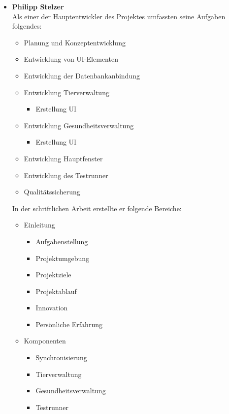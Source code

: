 \begin{itemize}

\item \textbf{Philipp Stelzer}\\
Als einer der Hauptentwickler des Projektes umfassten seine Aufgaben folgendes:
\begin{itemize}
\item Planung und Konzeptentwicklung
\item Entwicklung von UI-Elementen
\item Entwicklung der Datenbankanbindung
\item Entwicklung Tierverwaltung
\begin{itemize}
\item Erstellung UI
\end{itemize}
\item Entwicklung Gesundheitsverwaltung
\begin{itemize}
\item Erstellung UI
\end{itemize}
\item Entwicklung Hauptfenster
\item Entwicklung des Testrunner
\item Qualitätssicherung
\end{itemize}

In der schriftlichen Arbeit erstellte er folgende Bereiche:
\begin{itemize}
\item Einleitung
\begin{itemize}
\item Aufgabenstellung
\item Projektumgebung
\item Projektziele
\item Projektablauf
\item Innovation
\item Persönliche Erfahrung
\end{itemize}
\item Komponenten
\begin{itemize}
\item Synchronisierung
\item Tierverwaltung
\item Gesundheitsverwaltung
\item Testrunner
\end{itemize}
\end{itemize}
     

\end{itemize}
